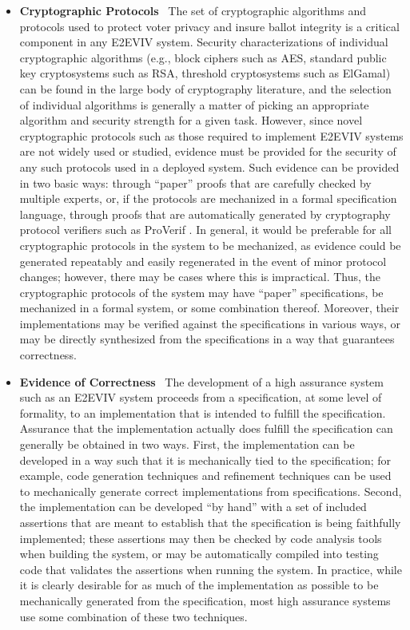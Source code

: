 \begin{itemize}
\item \textbf{Cryptographic Protocols} \ The set of cryptographic
  algorithms and protocols used to protect voter privacy and insure
  ballot integrity is a critical component in any E2EVIV
  system. Security characterizations of individual cryptographic
  algorithms (e.g., block ciphers such as AES, standard public key
  cryptosystems such as RSA, threshold cryptosystems such as ElGamal)
  can be found in the large body of cryptography literature, and the
  selection of individual algorithms is generally a matter of picking
  an appropriate algorithm and security strength for a given
  task. However, since novel cryptographic protocols such as those
  required to implement E2EVIV systems are not widely used or studied,
  evidence must be provided for the security of any such protocols
  used in a deployed system. Such evidence can be provided in two
  basic ways: through ``paper'' proofs that are carefully checked by
  multiple experts, or, if the protocols are mechanized in a formal
  specification language, through proofs that are automatically
  generated by cryptography protocol verifiers such as ProVerif
  \cite{ProVerif}. In general, it would be preferable for all
  cryptographic protocols in the system to be mechanized, as evidence
  could be generated repeatably and easily regenerated in the event of
  minor protocol changes; however, there may be cases where this is
  impractical. Thus, the cryptographic protocols of the system may
  have ``paper'' specifications, be mechanized in a formal system, or
  some combination thereof. Moreover, their implementations may be
  verified against the specifications in various ways, or may be
  directly synthesized from the specifications in a way that
  guarantees correctness.

\item \textbf{Evidence of Correctness} \ The development of a high
  assurance system such as an E2EVIV system proceeds from a
  specification, at some level of formality, to an implementation that
  is intended to fulfill the specification. Assurance that the
  implementation actually does fulfill the specification can generally
  be obtained in two ways. First, the implementation can be developed
  in a way such that it is mechanically tied to the specification; for
  example, code generation techniques and refinement techniques can be
  used to mechanically generate correct implementations from
  specifications. Second, the implementation can be developed ``by
  hand'' with a set of included assertions that are meant to establish
  that the specification is being faithfully implemented; these
  assertions may then be checked by code analysis tools when building
  the system, or may be automatically compiled into testing code that
  validates the assertions when running the system. In practice, while
  it is clearly desirable for as much of the implementation as
  possible to be mechanically generated from the specification, most
  high assurance systems use some combination of these two techniques.


\end{itemize}
